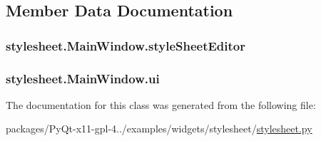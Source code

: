 \subsection{Member Data Documentation}
\hypertarget{classstylesheet_1_1MainWindow_a7f6014dd47934a5b6118e953f26a6ead}{}
\subsubsection[{style\+Sheet\+Editor}]{\setlength{\rightskip}{0pt plus 5cm}stylesheet.\+Main\+Window.\+style\+Sheet\+Editor}\label{classstylesheet_1_1MainWindow_a7f6014dd47934a5b6118e953f26a6ead}
\hypertarget{classstylesheet_1_1MainWindow_af36f1a1e1ebdbd23cf238df8169c7a3b}{}
\subsubsection[{ui}]{\setlength{\rightskip}{0pt plus 5cm}stylesheet.\+Main\+Window.\+ui}\label{classstylesheet_1_1MainWindow_af36f1a1e1ebdbd23cf238df8169c7a3b}


The documentation for this class was generated from the following file\+:\begin{DoxyCompactItemize}
\item 
packages/\+Py\+Qt-\/x11-\/gpl-\/4../examples/widgets/stylesheet/\hyperlink{stylesheet_8py}{stylesheet.\+py}\end{DoxyCompactItemize}

